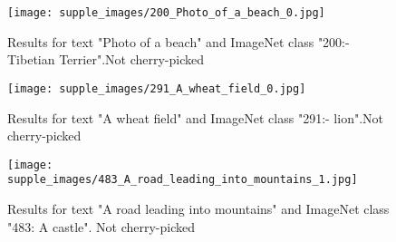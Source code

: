 \documentclass[10pt,twocolumn,letterpaper]{article}
\begin{document}
 \begin{figure*}[t!]
	\centering
			\texttt{[image: supple\_images/200\_Photo\_of\_a\_beach\_0.jpg]}
	\centering
	\caption{Results for text "Photo of a beach" and ImageNet class "200:- Tibetian Terrier".Not cherry-picked}
	\label{fig:t2im143}
	\vskip -10pt
\end{figure*}
 \begin{figure*}[t!]
	\centering
			\texttt{[image: supple\_images/291\_A\_wheat\_field\_0.jpg]}
	\centering
	\caption{Results for text "A wheat field" and ImageNet class "291:- lion".Not cherry-picked}
	\label{fig:t2im432}
	\vskip -10pt
\end{figure*}
 \begin{figure*}[t!]
	\centering
			\texttt{[image: supple\_images/483\_A\_road\_leading\_into\_mountains\_1.jpg]}
	\centering
	\caption{Results for text "A road leading into mountains" and ImageNet class "483: A castle". Not cherry-picked}
	\label{fig:t2im132}
	\vskip -10pt
\end{figure*}
\end{document}
